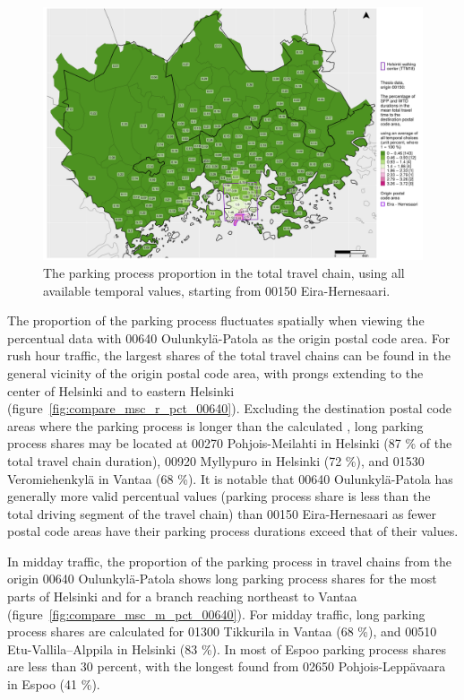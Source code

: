 \begin{figure}[H]%
    \centering
    \includegraphics[trim={0.9cm 0.3cm 0.25cm 0.3cm},clip,width=\textwidth]{images/compare_traveltimes_mapfill-msc_all_pct_fromzip-00150_28-09-2020.png}
    \caption[Parking process proportion from Eira-Hernesaari, all temporal values]{The parking process proportion in the total travel chain, using all available temporal values, starting from 00150 Eira-Hernesaari.}%
    \label{fig:compare_msc_all_pct_00150}%
\end{figure}

The proportion of the parking process fluctuates spatially when viewing the percentual data with 00640 Oulunkylä-Patola as the origin postal code area. For rush hour traffic, the largest shares of the total travel chains can be found in the general vicinity of the origin postal code area, with prongs extending to the center of Helsinki and to eastern Helsinki (figure~\ref{fig:compare_msc_r_pct_00640}). Excluding the destination postal code areas where the parking process is longer than the calculated , long parking process shares may be located at 00270 Pohjois-Meilahti in Helsinki (87 \% of the total travel chain duration), 00920 Myllypuro in Helsinki (72 \%), and 01530 Veromiehenkylä in Vantaa (68 \%). It is notable that 00640 Oulunkylä-Patola has generally more valid percentual values (parking process share is less than the total driving segment of the travel chain) than 00150 Eira-Hernesaari as fewer postal code areas have their parking process durations exceed that of their  values.

In midday traffic, the proportion of the parking process in travel chains from the origin 00640 Oulunkylä-Patola shows long parking process shares for the most parts of Helsinki and for a branch reaching northeast to Vantaa (figure~\ref{fig:compare_msc_m_pct_00640}). For midday traffic, long parking process shares are calculated for 01300 Tikkurila in Vantaa (68 \%), and 00510 Etu-Vallila--Alppila in Helsinki (83 \%). In most of Espoo parking process shares are less than 30 percent, with the longest found from 02650 Pohjois-Leppävaara in Espoo (41 \%).


